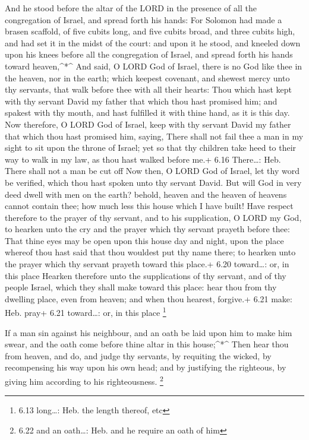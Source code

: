  And he stood before the altar of the LORD in the presence
of all the congregation of Israel, and spread forth his hands:
 For Solomon had made a brasen scaffold, of five cubits
long, and five cubits broad, and three cubits high, and had set it in
the midst of the court: and upon it he stood, and kneeled down upon his
knees before all the congregation of Israel, and spread forth his hands
toward heaven,\^{}*\^{}  And said, O LORD God of Israel,
there is no God like thee in the heaven, nor in the earth; which keepest
covenant, and shewest mercy unto thy servants, that walk before thee
with all their hearts:  Thou which hast kept with thy
servant David my father that which thou hast promised him; and spakest
with thy mouth, and hast fulfilled it with thine hand, as it is this
day.  Now therefore, O LORD God of Israel, keep with thy
servant David my father that which thou hast promised him, saying, There
shall not fail thee a man in my sight to sit upon the throne of Israel;
yet so that thy children take heed to their way to walk in my law, as
thou hast walked before me.+ 6.16 There\ldots: Heb. There shall not a
man be cut off  Now then, O LORD God of Israel, let thy
word be verified, which thou hast spoken unto thy servant David.
 But will God in very deed dwell with men on the earth?
behold, heaven and the heaven of heavens cannot contain thee; how much
less this house which I have built!  Have respect therefore
to the prayer of thy servant, and to his supplication, O LORD my God, to
hearken unto the cry and the prayer which thy servant prayeth before
thee:  That thine eyes may be open upon this house day and
night, upon the place whereof thou hast said that thou wouldest put thy
name there; to hearken unto the prayer which thy servant prayeth toward
this place.+ 6.20 toward\ldots: or, in this place  Hearken
therefore unto the supplications of thy servant, and of thy people
Israel, which they shall make toward this place: hear thou from thy
dwelling place, even from heaven; and when thou hearest, forgive.+ 6.21
make: Heb. pray+ 6.21 toward\ldots: or, in this place \footnote{6.13
  long\ldots: Heb. the length thereof, etc}

 If a man sin against his neighbour, and an oath be laid
upon him to make him swear, and the oath come before thine altar in this
house;\^{}*\^{}  Then hear thou from heaven, and do, and
judge thy servants, by requiting the wicked, by recompensing his way
upon his own head; and by justifying the righteous, by giving him
according to his righteousness. \footnote{6.22 and an oath\ldots: Heb.
  and he require an oath of him}

